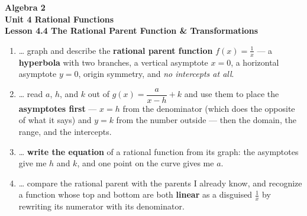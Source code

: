 \documentclass[10pt]{article}
\begin{document}
\vspace{-0.8in}

\begin{center}
  {\color{white}\textbf{\LARGE Algebra 2}}\\[4pt]
  {\color{forestmid}\large\textbf{Unit 4 \quad Rational Functions}}\\[6pt]
  {\color{white}\textbf{\large Lesson 4.4 \quad The Rational Parent Function \& Transformations}}
\end{center}

\vspace{0.22in}
\namedateperiod
\vspace{0.18in}

\begin{learningtargetbox}
\small
\begin{enumerate}[leftmargin=1.5em, itemsep=5pt]
  \item \ldots{} graph and describe the \textbf{rational parent function} $f(x)=\frac1x$ --- a
        \textbf{hyperbola} with two branches, a vertical asymptote $x=0$, a horizontal asymptote
        $y=0$, origin symmetry, and \emph{no intercepts at all}.
  \item \ldots{} read $a$, $h$, and $k$ out of $g(x)=\dfrac{a}{x-h}+k$ and use them to place the
        \textbf{asymptotes first} --- $x=h$ from the denominator (which does the opposite of what it
        says) and $y=k$ from the number outside --- then the domain, the range, and the intercepts.
  \item \ldots{} \textbf{write the equation} of a rational function from its graph: the asymptotes
        give me $h$ and $k$, and one point on the curve gives me $a$.
  \item \ldots{} compare the rational parent with the parents I already know, and recognize a
        function whose top and bottom are both \textbf{linear} as a disguised $\frac1x$ by rewriting
        its numerator with its denominator.
\end{enumerate}
\end{learningtargetbox}

\vspace{0.14in}
\end{document}
